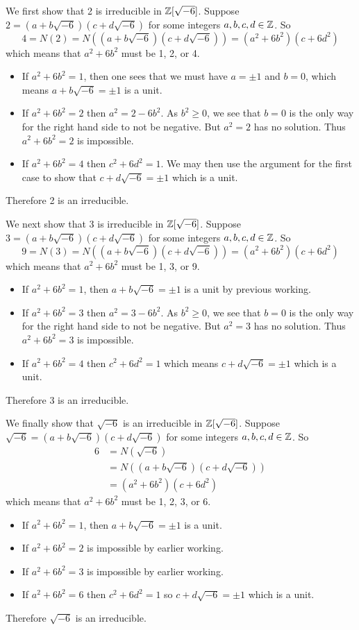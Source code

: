 \begin{questions}
    We first show that 2 is irreducible in $\mathbb{Z}[\sqrt{-6}]$. Suppose $2 = (a+b\sqrt{-6})(c+d\sqrt{-6})$ for some integers $a,b,c,d\in \mathbb{Z}$. So
    \[
        4 = N(2) = N\left((a+b\sqrt{-6})(c+d\sqrt{-6})\right) = (a^2+6b^2)(c+6d^2)
    \]
    which means that $a^2+6b^2$ must be 1, 2, or 4.
    \begin{itemize}
        \item If $a^2+6b^2 = 1$, then one sees that we must have $a = \pm1$ and $b = 0$, which means $a+b\sqrt{-6} = \pm1$ is a unit.
        \item If $a^2+6b^2 = 2$ then $a^2 = 2 - 6b^2$. As $b^2 \geq 0$, we see that $b = 0$ is the only way for the right hand side to not be negative. But $a^2 = 2$ has no solution. Thus $a^2+6b^2 = 2$ is impossible.
        \item If $a^2+6b^2 = 4$ then $c^2+6d^2 = 1$. We may then use the argument for the first case to show that $c+d\sqrt{-6} = \pm1$ which is a unit.
    \end{itemize}
    Therefore 2 is an irreducible.

    We next show that 3 is irreducible in $\mathbb{Z}[\sqrt{-6}]$. Suppose $3 = (a+b\sqrt{-6})(c+d\sqrt{-6})$ for some integers $a,b,c,d\in \mathbb{Z}$. So
    \[
        9 = N(3) = N\left((a+b\sqrt{-6})(c+d\sqrt{-6})\right) = (a^2+6b^2)(c+6d^2)
    \]
    which means that $a^2+6b^2$ must be 1, 3, or 9.
    \begin{itemize}
        \item If $a^2+6b^2 = 1$, then $a+b\sqrt{-6} = \pm1$ is a unit by previous working.
        \item If $a^2+6b^2 = 3$ then $a^2 = 3 - 6b^2$. As $b^2 \geq 0$, we see that $b = 0$ is the only way for the right hand side to not be negative. But $a^2 = 3$ has no solution. Thus $a^2+6b^2 = 3$ is impossible.
        \item If $a^2+6b^2 = 4$ then $c^2+6d^2 = 1$ which means $c+d\sqrt{-6} = \pm1$ which is a unit.
    \end{itemize}
    Therefore 3 is an irreducible.

    We finally show that $\sqrt{-6}$ is an irreducible in $\mathbb{Z}[\sqrt{-6}]$. Suppose $\sqrt{-6} = (a+b\sqrt{-6})(c+d\sqrt{-6})$ for some integers $a,b,c,d\in \mathbb{Z}$. So
    \begin{align*}
        6 &= N(\sqrt{-6})\\
        &= N\left((a+b\sqrt{-6})(c+d\sqrt{-6})\right)\\
        &= (a^2+6b^2)(c+6d^2)
    \end{align*}
    which means that $a^2+6b^2$ must be 1, 2, 3, or 6.
    \begin{itemize}
        \item If $a^2+6b^2 = 1$, then $a+b\sqrt{-6} = \pm1$ is a unit.
        \item If $a^2+6b^2 = 2$ is impossible by earlier working.
        \item If $a^2+6b^2 = 3$ is impossible by earlier working.
        \item If $a^2+6b^2 = 6$ then $c^2+6d^2 = 1$ so $c+d\sqrt{-6} = \pm1$ which is a unit.
    \end{itemize}
    Therefore $\sqrt{-6}$ is an irreducible.


\end{questions}
